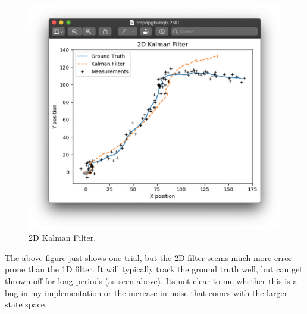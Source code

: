 \documentclass{article}
\begin{document}
\begin{figure}[h!]
    \includegraphics[width=12cm]{2d_kalman.png}
    \centering
    \caption{2D Kalman Filter.}
\end{figure} 

The above figure just shows one trial, but the 2D filter seems much more error-prone than the 1D filter. It will typically track the ground truth well, but can get thrown off for long periods (as seen above). Its not clear to me whether this is a bug in my implementation or the increase in noise that comes with the larger state space. 

%
%
\end{document}
